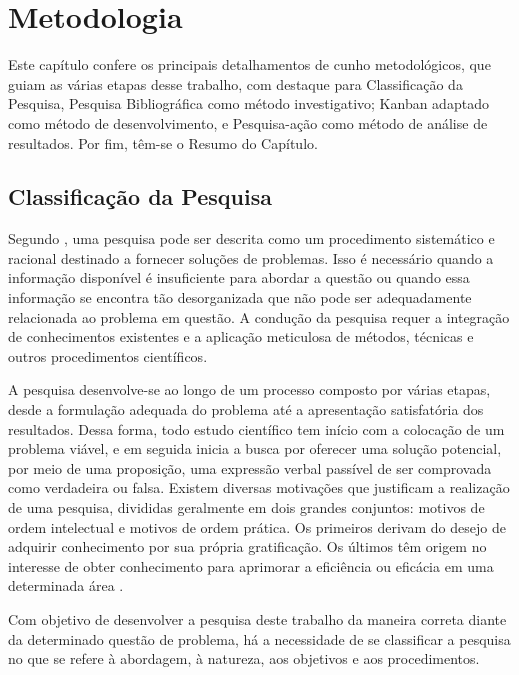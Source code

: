 \chapter[Metodologia]{Metodologia}
\label{chap:met}

Este capítulo confere os principais detalhamentos de cunho metodológicos, que guiam as várias etapas desse trabalho, com destaque para Classificação da Pesquisa, Pesquisa Bibliográfica como método investigativo; Kanban adaptado como método de desenvolvimento, e Pesquisa-ação como método de análise de resultados. Por fim, têm-se o Resumo do Capítulo.

\section{Classificação da Pesquisa}

Segundo \cite{ProjPesquisaGil}, uma pesquisa pode ser descrita como um procedimento sistemático e racional destinado a fornecer soluções de problemas. Isso é necessário quando a informação disponível é insuficiente para abordar a questão ou quando essa informação se encontra tão desorganizada que não pode ser adequadamente relacionada ao problema em questão. A condução da pesquisa requer a integração de conhecimentos existentes e a aplicação meticulosa de métodos, técnicas e outros procedimentos científicos. 

A pesquisa desenvolve-se ao longo de um processo composto por várias etapas, desde a formulação adequada do problema até a apresentação satisfatória dos resultados. Dessa forma, todo estudo científico tem início com a colocação de um problema viável, e em seguida inicia a busca por oferecer uma solução potencial, por meio de uma proposição, uma expressão verbal passível de ser comprovada como verdadeira ou falsa. Existem diversas motivações que justificam a realização de uma pesquisa, divididas geralmente em dois grandes conjuntos: motivos de ordem intelectual e motivos de ordem prática. Os primeiros derivam do desejo de adquirir conhecimento por sua própria gratificação. Os últimos têm origem no interesse de obter conhecimento para aprimorar a eficiência ou eficácia em uma determinada área \cite{ProjPesquisaGil}.

Com objetivo de desenvolver a pesquisa deste trabalho da maneira correta diante da determinado questão de problema, há a necessidade de se classificar a pesquisa no que se refere à abordagem, à natureza, aos objetivos e aos procedimentos.

